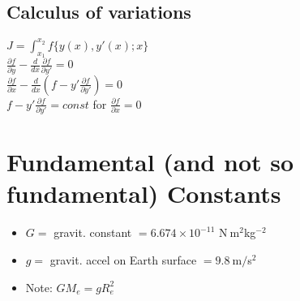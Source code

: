 \documentclass[letterpaper,landscape,10pt]{article}
\newenvironment{myitemize}
{\begin{itemize}
	\setlength{\itemsep}{-1pt}
	\setlength{\parskip}{0pt}
	\setlength{\parsep}{0pt}}
{\end{itemize}}
\begin{document}
{\begin{multicols}{3}
		\subsection*{Calculus of variations}
			$J = \int_{x_1}^{x_2} f\{y(x), y\prime (x); x\}$\\
			$\frac{\partial f}{\partial y}-\frac{d}{dx}\frac{\partial
			f}{\partial y\prime} = 0$\\
			$\frac{\partial f}{\partial x}-\frac{d}{dx}\left(f-y\prime
			\frac{\partial f}{\partial y\prime}\right) = 0$\\
			$f-y\prime \frac{\partial f}{\partial y\prime} =
				const$ for $\frac{\partial f}{\partial x} = 0$

\section*{Fundamental (and not so fundamental) Constants}
	\begin{myitemize}




		\item[$G = $]
		  gravit. constant $ = 6.674\times10^{-11}$ N$\>$m$^2$kg$^{-2}$
		\item[$g = $]
		  gravit. accel on Earth surface $ = 9.8 \>$m$/$s$^{2}$
		\item[Note:] $GM_e=gR_e^2$

		\vspace{4pt}


\end{myitemize}
\end{multicols}}
\end{document}
